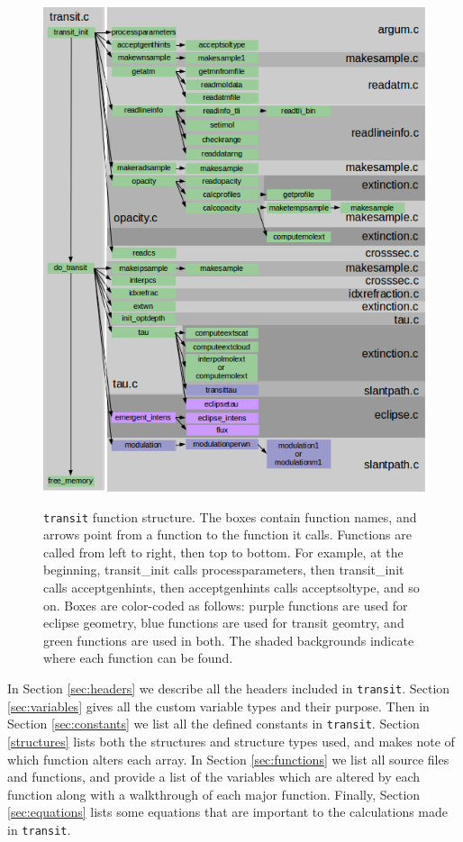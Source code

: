 \documentclass[letterpaper,12pt]{article}
\begin{document}
\begin{figure}
\includegraphics{fig/transit_diagram}
\label{fig:codediagram}
\caption{{\tt transit} function structure. The boxes contain function names, and arrows point from a function to the function it calls. Functions are called from left to right, then top to bottom. For example, at the beginning, transit\_init calls processparameters, then transit\_init calls acceptgenhints, then acceptgenhints calls acceptsoltype, and so on. Boxes are color-coded as follows:  purple functions are used for eclipse geometry, blue functions are used for transit geomtry, and green functions are used in both. The shaded backgrounds indicate where each function can be found.}
\end{figure}

In Section \ref{sec:headers} we describe all the headers included in {\tt transit}. Section \ref{sec:variables} gives all the custom variable types and their purpose. Then in Section \ref{sec:constants} we list all the defined constants in {\tt transit}. Section \ref{structures} lists both the structures and structure types used, and makes note of which function alters each array. In Section \ref{sec:functions} we list all source files and functions, and provide a list of the variables which are altered by each function along with a walkthrough of each major function. Finally, Section \ref{sec:equations} lists some equations that are important to the calculations made in {\tt transit}.
\pagebreak
\end{document}
